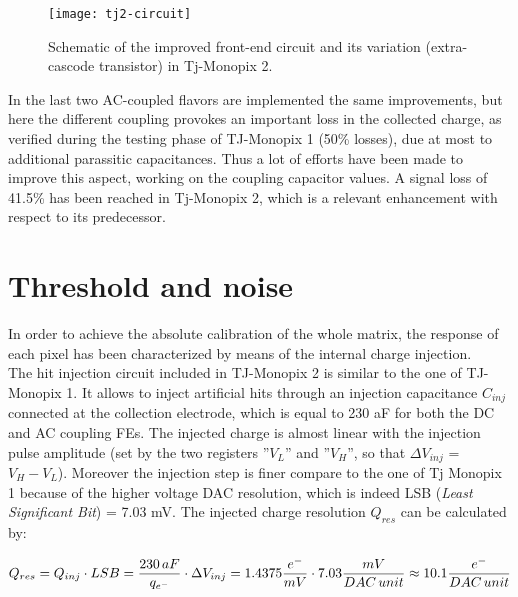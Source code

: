
\begin{figure}[h!]
\centering
\texttt{[image: tj2-circuit]}
\caption{Schematic of the improved front-end circuit and its variation (extra-cascode transistor) in Tj-Monopix 2.}
\label{fig:tj2_circuit}
\end{figure}


In the last two AC-coupled flavors are implemented the same improvements, but here the different coupling provokes an important loss in the collected charge, as verified during the testing phase of TJ-Monopix 1 (50\% losses), due at most to additional parassitic capacitances. Thus a lot of efforts have been made to improve this aspect, working on the coupling capacitor values. A signal loss of 41.5\% has been reached in Tj-Monopix 2, which is a relevant enhancement with respect to its predecessor.





\section{Threshold and noise} \label{thresh_noise}

In order to achieve the absolute calibration of the whole matrix, the response of each pixel has been characterized by means of the internal charge injection. \\

The hit injection circuit included in TJ-Monopix 2 is similar to the one of TJ-Monopix 1. It allows to inject artificial hits through an injection capacitance \textbf{$C_{inj}$} connected at the collection electrode, which is equal to 230 aF for both the DC and AC coupling FEs. The injected charge is almost linear with the injection pulse amplitude (set by the two registers ''\textbf{$V_{L}$}'' and ''\textbf{$V_{H}$}'', so that $\Delta V_{inj}$ = \textbf{$V_{H}-V_{L}$}). Moreover the injection step is finer compare to the one of Tj Monopix 1 because of the higher voltage DAC resolution, which is indeed LSB (\textit{Least Significant Bit}) = 7.03 mV. 
The injected charge resolution $Q_{res}$ can be calculated by:

\begin{equation}
\small
Q_{res} = Q_{inj} \cdot LSB= \frac{230 \, aF}{q_{{e}^{-}}} \cdot \Delta V_{inj} = 1.4375 \frac{e^{-}}{mV} \cdot 7.03 \frac{mV}{DAC \, unit} \approx 10.1 \frac{e^{-}}{DAC \, unit}  
\label{conversion_factor}
\end{equation}

